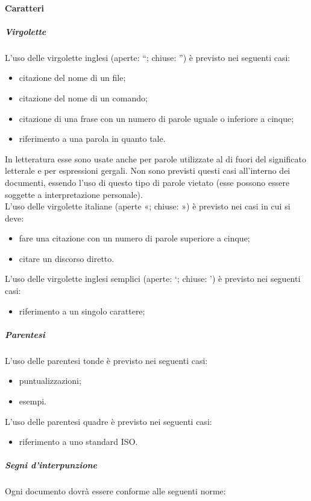			\paragraph{Caratteri}
				\subparagraph{Virgolette}
					L’uso delle virgolette inglesi (aperte: “; chiuse: ”) è previsto nei seguenti casi:
					\begin{itemize}
						\item citazione del nome di un file;
						\item citazione del nome di un comando;
						\item citazione di una frase con un numero di parole uguale o inferiore a cinque;
						\item riferimento a una parola in quanto tale.
					\end{itemize}
					In letteratura esse sono usate anche per parole utilizzate al di fuori del significato letterale e per espressioni gergali. Non sono previsti questi casi all’interno dei documenti, essendo l’uso di questo tipo di parole vietato (esse possono essere soggette a interpretazione personale).\\
					L’uso delle virgolette italiane (aperte «; chiuse: ») è previsto nei casi in cui si deve:
					\begin{itemize}
						\item fare una citazione con un numero di parole superiore a cinque;
						\item citare un discorso diretto.
					\end{itemize}
					L’uso delle virgolette inglesi semplici (aperte: ‘; chiuse: ’) è previsto nei seguenti casi:
					\begin{itemize}
						\item riferimento a un singolo carattere;
					\end{itemize}
				\subparagraph{Parentesi}
					L’uso delle parentesi tonde è previsto nei seguenti casi:
					\begin{itemize}
						\item puntualizzazioni;
						\item esempi.
					\end{itemize}
					L’uso delle parentesi quadre è previsto nei seguenti casi:
					\begin{itemize}
						\item riferimento a uno standard ISO.
					\end{itemize}
				\subparagraph{Segni d'interpunzione}
					Ogni documento dovrà essere conforme alle seguenti norme:

